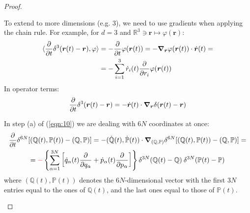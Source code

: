 \documentclass[../../main.tex]{subfiles}
\begin{document}
\begin{proof}
\begin{expl}
    To extend to more dimensions (e.g. $3$), we need to use gradients when applying the chain rule. For example, for $d=3$ and $\mathbb{R}^3 \ni \bm{r} \mapsto \varphi(\bm{r})$:
    \begin{align*}
        \langle \pdv{t} \delta^3(\bm{r}(t) - \bm{r}), \varphi\rangle &= -\pdv{t} \varphi(\bm{r}(t)) = -\grad_{\bm{r}} \varphi(\bm{r}(t)) \cdot \dot{\bm{r}}(t) =\\
        &= - \sum_{i=1}^3 \dot{r}_i(t) \pdv{r_i} \varphi(\bm{r}(t))
    \end{align*}
    In operator terms:
    \begin{align*}
        \pdv{t}\delta^3(\bm{r}(t)-\bm{r}) = -\dot{\bm{r}}(t) \cdot \grad_{\bm{r}} \delta(\bm{r}(t) - \bm{r})
    \end{align*}

    In step (a) of (\ref{eqn:10}) we are dealing with $6N$ coordinates at once:
    \begin{align*}
        \pdv{t} \delta^{6N}[(\mathbb{Q}(t), \mathbb{P}(t)) - (\mathbb{Q},\mathbb{P})] &= -(\dot{\mathbb{Q}}(t), \dot{\mathbb{P}}(t)) \cdot \grad_{(\bm{\mathbb{Q}}, \bm{\mathbb{P}})} \delta^{6N}[(\mathbb{Q}(t), \mathbb{P}(t)) - (\mathbb{Q},\mathbb{P})] =\\
        =\textcolor{Red}{-} \left\{\sum_{\alpha=1}^{3N} \left[\dot{q}_\alpha(t) \pdv{q_\alpha} + \dot{p}_\alpha(t) \pdv{p_\alpha}\right] \right\} \delta^{3N}(\mathbb{Q}(t) - \mathbb{Q}) \>  \delta^{3N}(\mathbb{P}(t) - \mathbb{P}) \span
    \end{align*}
    where $(\mathbb{Q}(t), \mathbb{P}(t))$ denotes the $6N$-dimensional vector with the first $3N$ entries equal to the ones of $\mathbb{Q}(t)$, and the last ones equal to those of $\mathbb{P}(t)$.
        
    \end{expl}


\end{proof}
\end{document}
